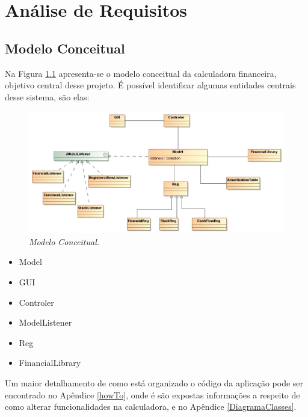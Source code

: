 \chapter{Análise de Requisitos}

\section{Modelo Conceitual}


Na Figura \ref{tab:modeConc} apresenta-se o modelo conceitual da calculadora financeira, objetivo central desse projeto. É possível identificar algumas entidades centrais desse sistema, são elas:

\begin{figure}[!h]
 \includegraphics[scale=0.5]{CalcDC.eps}
 \caption{\it Modelo Conceitual.} \label{tab:modeConc}
\end{figure}

\begin{itemize}
	\item Model
	\item GUI
	\item Controler
	\item ModelListener
	\item Reg
	\item FinancialLibrary
\end{itemize}

Um maior detalhamento de como está organizado o código da aplicação pode ser encontrado no Apêndice \ref{howTo}, onde é são expostas informações a respeito de como alterar funcionalidades na calculadora, e no Apêndice \ref{DiagramaClasses}.

